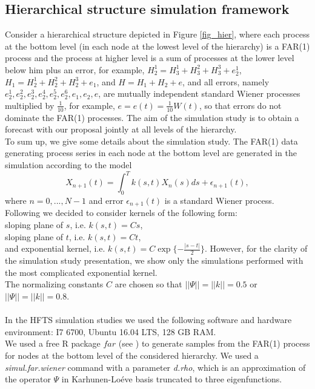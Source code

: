 \documentclass[12pt,a4paper]{article}
\numberwithin{equation}{section}
\begin{document}
\subsection{Hierarchical structure simulation framework}
Consider a hierarchical structure depicted in Figure \ref{fig_hier}, where each process at the bottom level (in each node at the lowest level of the hierarchy) is a FAR(1) process and the process at higher level is a sum of processes at the lower level below him plus an error, for example, $H^1_2=H^1_3+H^2_3+H^3_3+e^1_2$,
$H_1=H^1_2+H^2_2+H^3_2+e_1$, and $H=H_1+H_2+e$, and all errors, namely $e^1_2,e^2_2,e^3_2,e^4_2,e^5_2,e^6_2,e_1,e_2,e$, are mutually independent standard Wiener processes multiplied by $\frac{1}{10}$, for example, $e=e(t)=\frac1{10}W(t)$, so that errors do not dominate the FAR(1) processes.
The aim of the simulation study is to obtain a forecast with our proposal jointly at all levels of the hierarchy.
\\ To sum up, we give some details about the simulation study. The FAR(1) data generating process series in each node at the bottom level are generated in the simulation according to the model
$$X_{n+1}(t)=\int_0^Tk(s,t)X_n(s)ds+\epsilon_{n+1}(t),$$ where $n = 0,...,N-1$ and error $\epsilon_{n+1}(t)$ is a standard Wiener process. 
\\ Following \cite{Dider} we decided to consider kernels of the following form:
\\ sloping plane of $s$, i.e. $k(s,t)=Cs$, 
\\ sloping plane of $t$, i.e. $k(s,t)=Ct$,
\\ and exponential kernel, i.e. $k(s,t)=C\exp\{-\frac{|s-t|}{2}\}$. However, for the clarity of the simulation study presentation, we show only the simulations performed with the most complicated exponential kernel.
\\ The normalizing constants $C$ are chosen so that $||\Psi||=||k||=0.5$ or \\ $||\Psi||=||k||=0.8$.
\\
\\ In the HFTS simulation studies we used the following software and hardware environment: I7 6700, Ubuntu 16.04 LTS, 128 GB RAM. 
\\ We used a free R package $far$ (see \cite{far}) to generate samples from the FAR(1) process for nodes at the bottom level of the considered hierarchy.
We used a \textit{simul.far.wiener} command with a parameter \textit{d.rho}, which is an approximation of the operator $\Psi$ in Karhunen-Lo\'eve basis truncated to three eigenfunctions.
\end{document}
